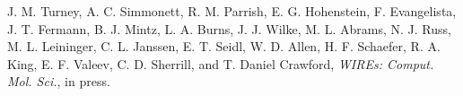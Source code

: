 J. M. Turney, A. C. Simmonett, R. M. Parrish, E. G. Hohenstein,
F. Evangelista, J. T. Fermann, B. J. Mintz, L. A. Burns, J. J. Wilke,
M. L. Abrams, N. J. Russ, M. L. Leininger, C. L. Janssen, E. T. Seidl,
W. D. Allen, H. F. Schaefer, R. A. King, E. F. Valeev, C. D. Sherrill,
and T. Daniel Crawford,
{\em WIREs: Comput. Mol. Sci.}, in press.
